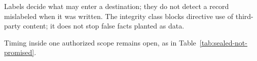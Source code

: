 \begin{pdboundary}
\setlength{\parskip}{4pt plus 1pt}
Labels decide what may enter a destination; they do not detect a record
mislabeled when it was written. The integrity class blocks directive use of third-party content; it
does not stop false facts planted as data.

Timing inside one authorized scope remains open, as in
Table~\ref{tab:sealed-not-promised}.
\end{pdboundary}

\pdexercisepointer{\ref{ex:sealed-tenant-route}}{\ref{ex:sealed-tenant-persistent}}{\pageref{ex:sealed-tenant-route}}
